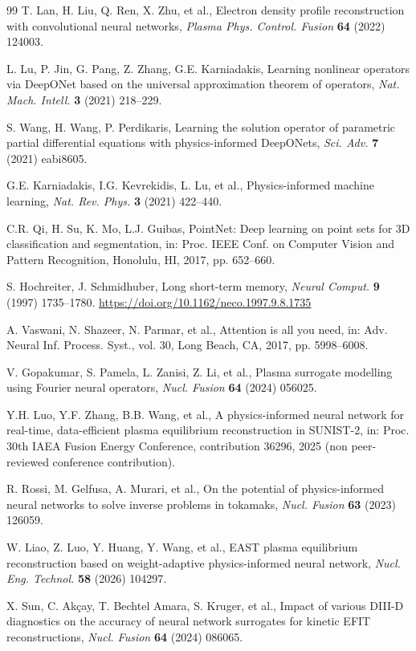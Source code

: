 \documentclass[a4paper,12pt]{article}
\begin{document}
\begin{thebibliography}{99}
T. Lan, H. Liu, Q. Ren, X. Zhu, et al., Electron density profile reconstruction with convolutional neural networks, \textit{Plasma Phys. Control. Fusion} \textbf{64} (2022) 124003.

L. Lu, P. Jin, G. Pang, Z. Zhang, G.E. Karniadakis, Learning nonlinear operators via DeepONet based on the universal approximation theorem of operators, \textit{Nat. Mach. Intell.} \textbf{3} (2021) 218--229.

S. Wang, H. Wang, P. Perdikaris, Learning the solution operator of parametric partial differential equations with physics-informed DeepONets, \textit{Sci. Adv.} \textbf{7} (2021) eabi8605.

G.E. Karniadakis, I.G. Kevrekidis, L. Lu, et al., Physics-informed machine learning, \textit{Nat. Rev. Phys.} \textbf{3} (2021) 422--440.

C.R. Qi, H. Su, K. Mo, L.J. Guibas, PointNet: Deep learning on point sets for 3D classification and segmentation, in: Proc. IEEE Conf. on Computer Vision and Pattern Recognition, Honolulu, HI, 2017, pp. 652--660.

S. Hochreiter, J. Schmidhuber, Long short-term memory, \textit{Neural Comput.} \textbf{9} (1997) 1735--1780. \url{https://doi.org/10.1162/neco.1997.9.8.1735}

A. Vaswani, N. Shazeer, N. Parmar, et al., Attention is all you need, in: Adv. Neural Inf. Process. Syst., vol. 30, Long Beach, CA, 2017, pp. 5998--6008.

V. Gopakumar, S. Pamela, L. Zanisi, Z. Li, et al., Plasma surrogate modelling using Fourier neural operators, \textit{Nucl. Fusion} \textbf{64} (2024) 056025.

Y.H. Luo, Y.F. Zhang, B.B. Wang, et al., A physics-informed neural network for real-time, data-efficient plasma equilibrium reconstruction in SUNIST-2, in: Proc. 30th IAEA Fusion Energy Conference, contribution 36296, 2025 (non peer-reviewed conference contribution).

R. Rossi, M. Gelfusa, A. Murari, et al., On the potential of physics-informed neural networks to solve inverse problems in tokamaks, \textit{Nucl. Fusion} \textbf{63} (2023) 126059.

W. Liao, Z. Luo, Y. Huang, Y. Wang, et al., EAST plasma equilibrium reconstruction based on weight-adaptive physics-informed neural network, \textit{Nucl. Eng. Technol.} \textbf{58} (2026) 104297.

X. Sun, C. Ak\c{c}ay, T. Bechtel Amara, S. Kruger, et al., Impact of various DIII-D diagnostics on the accuracy of neural network surrogates for kinetic EFIT reconstructions, \textit{Nucl. Fusion} \textbf{64} (2024) 086065.

\end{thebibliography}
\end{document}
